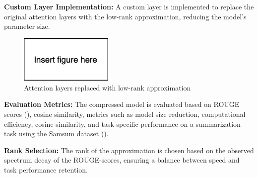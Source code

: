         \textbf{Custom Layer Implementation:} A custom layer is implemented to replace the original attention layers with the low-rank approximation, reducing the model's parameter size.
            \begin{figure}[H]
                \centering
                \includegraphics[width=0.4\textwidth]{figs/insert.png}
                \caption{Attention layers replaced with low-rank approximation}
                \label{fig:lora_implementation}
            \end{figure}
        \textbf{Evaluation Metrics:} The compressed model is evaluated based on ROUGE scores (\cite{lin-2004-rouge}), cosine similarity, metrics such as model size reduction, computational efficiency, cosine similarity, and task-specific performance on a summarization task using the Samsum dataset (\cite{gliwa-etal-2019-samsum}).
        
        \textbf{Rank Selection:} The rank of the approximation is chosen based on the observed spectrum decay of the ROUGE-scores, ensuring a balance between speed and task performance retention.
    